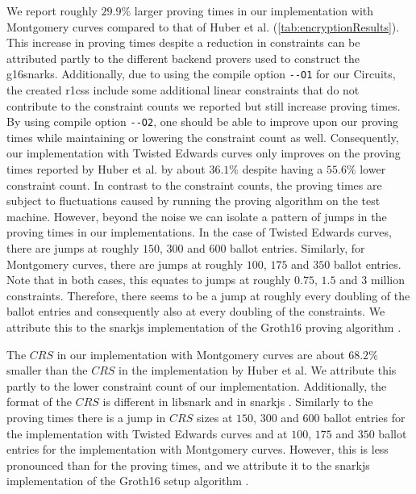 We report roughly $29.9\%$ larger proving times in our implementation with Montgomery curves compared to that of Huber et al. (\cref{tab:encryptionResults}).
This increase in proving times despite a reduction in constraints can be attributed partly to the different backend provers used to construct the \glspl{g16snark}.
Additionally, due to using the compile option \verb|--O1| for our Circuits, the created \glspl{r1cs} include some additional linear constraints that do not contribute to the constraint counts we reported but still increase proving times.
By using compile option \verb|--O2|, one should be able to improve upon our proving times while maintaining or lowering the constraint count as well.
Consequently, our implementation with Twisted Edwards curves only improves on the proving times reported by Huber et al. by about $36.1\%$ despite having a $55.6\%$ lower constraint count.
In contrast to the constraint counts, the proving times are subject to fluctuations caused by running the proving algorithm on the test machine.
However, beyond the noise we can isolate a pattern of jumps in the proving times in our implementations.
In the case of Twisted Edwards curves, there are jumps at roughly $150$, $300$ and $600$ ballot entries.
Similarly, for Montgomery curves, there are jumps at roughly $100$, $175$ and $350$ ballot entries. 
Note that in both cases, this equates to jumps at roughly $0.75$, $1.5$ and $3$ million constraints.
Therefore, there seems to be a jump at roughly every doubling of the ballot entries and consequently also at every doubling of the constraints.
We attribute this to the snarkjs implementation of the Groth16 proving algorithm \cite{jordi_baylina_iden3snarkjs_2025}.

The $CRS$ in our implementation with Montgomery curves are about $68.2\%$ smaller than the $CRS$ in the implementation by Huber et al.
We attribute this partly to the lower constraint count of our implementation.
Additionally, the format of the $CRS$ is different in libsnark and in snarkjs \cite{huber_zk-snarks_2025,jordi_baylina_iden3snarkjs_2025}.
Similarly to the proving times there is a jump in $CRS$ sizes at $150$, $300$ and $600$ ballot entries for the implementation with Twisted Edwards curves and at $100$, $175$ and $350$ ballot entries for the implementation with Montgomery curves.
However, this is less pronounced than for the proving times, and we attribute it to the snarkjs implementation of the Groth16 setup algorithm \cite{jordi_baylina_iden3snarkjs_2025}.

